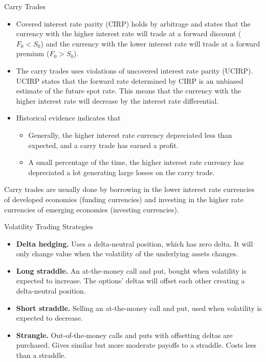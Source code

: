 \documentclass[../custom,grid]{flashcards}
\newcommand{\studyArea}{Risk Management}
\begin{document}
\begin{flashcard}[\studyArea]{Carry Trades}
    \begin{flushleft}
        \begin{itemize}
            \item Covered interest rate parity (CIRP) holds by arbitrage and states that the currency with the higher interest rate will trade at a forward discount ($F_0 < S_0$) and the currency with the lower interest rate will trade at a forward premium ($F_0 > S_0$).
            \item The carry trades uses violations of uncovered interest rate parity (UCIRP). UCIRP states that the forward rate determined by CIRP is an unbiased estimate of the future spot rate. This means that the currency with the higher interest rate will decrease by the interest rate differential.
            \item Historical evidence indicates that
            \begin{itemize}
                \item Generally, the higher interest rate currency depreciated less than expected, and a carry trade has earned a profit.
                \item A small percentage of the time, the higher interest rate currency has depreciated a lot generating large losses on the carry trade.
            \end{itemize}
        \end{itemize}

        Carry trades are usually done by borrowing in the lower interest rate currencies of developed economies (funding currencies) and investing in the higher rate currencies of emerging economies (investing currencies).
    \end{flushleft}
\end{flashcard}

\begin{flashcard}[\studyArea]{Volatility Trading Strategies}
    \begin{itemize}
        \item \textbf{Delta hedging.} Uses a delta-neutral position, which has zero delta. It will only change value when the volatility of the underlying assets changes.
        \item \textbf{Long straddle.} An at-the-money call and put, bought when volatility is expected to increase. The options' deltas will offset each other creating a delta-neutral position.
        \item \textbf{Short straddle.} Selling an at-the-money call and put, used when volatility is expected to decrease.
        \item \textbf{Strangle.} Out-of-the-money calls and puts with offsetting deltas are purchased. Gives similar but more moderate payoffs to a straddle. Costs less than a straddle.
    \end{itemize}
\end{flashcard}
\end{document}
